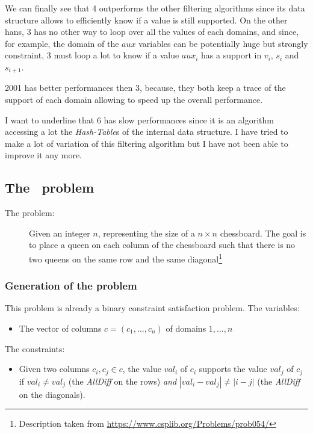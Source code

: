 \documentclass{rapport}
\begin{document}
We can finally see that \ac{4} outperforms the other filtering algorithms since its data structure allows to efficiently know if a value is still supported. On the other hans, \ac{3} has no other way to loop over all the values of each domains, and since, for example, the domain of the $aux$ variables can be potentially huge but strongly constraint, \ac{3} must loop a lot to know if a value $aux_i$ has a support in $v_i$, $s_i$ and $s_{i+1}$.

\ac{2001} has better performances then \ac{3}, because, they both keep a trace of the support of each domain allowing to speed up the overall performance.

I want to underline that \ac{6} has slow performances since it is an algorithm accessing a lot the \textit{Hash-Table}s of the internal data structure. I have tried to make a lot of variation of this filtering algorithm but I have not been able to improve it any more.

\subsection{The \queens\ problem}

\begin{description}
  \item[The problem:] Given an integer $n$, representing the size of a $n \times n$ chessboard. The goal is to place a queen on each column of the chessboard such that there is no two queens on the same row and the same diagonal\footnote{Description taken from \url{https://www.csplib.org/Problems/prob054/}}
\end{description}

\subsubsection{Generation of the problem}

This problem is already a binary constraint satisfaction problem.
The variables:
\begin{itemize}
  \item The vector of columns $c = (c_1, \dots, c_n)$ of domains $1, \dots, n$
\end{itemize}

The constraints:
\begin{itemize}
  \item Given two columns $c_i, c_j \in c$, the value $val_i$ of $c_i$ supports the value $val_j$ of $c_j$ if $val_i \neq val_j$ (the \textit{AllDiff} on the rows) \textit{and} $|val_i - val_j| \neq |i - j|$ (the \textit{AllDiff} on the diagonals).
\end{itemize}
\end{document}
